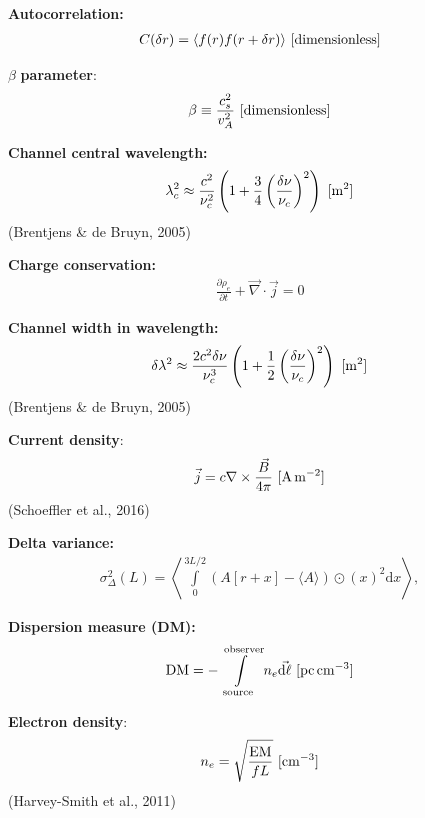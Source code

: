 \documentclass[a4paper,10pt]{article}
\begin{document}
{\noindent}\textbf{Autocorrelation:}
\begin{align*}
    C(\delta r) = \langle f(r)f(r+\delta r)\rangle ~ [{\rm dimensionless}]
\end{align*}

{\noindent}$\beta$ \textbf{parameter}: 
\begin{align*}
    \beta \equiv \frac{c_s^2}{v_A^2} ~ [{\rm dimensionless}]
\end{align*}

{\noindent}\textbf{Channel central wavelength:} 
\begin{align*}
\lambda_c^2 \approx \dfrac{c^2}{\nu_c^2} \left(1+\dfrac{3}{4}\left(\dfrac{\delta\nu}{\nu_c}\right)^2\right) ~ [{\rm m^2}]
\end{align*}
(Brentjens \& de Bruyn, 2005)

{\noindent}\textbf{Charge conservation:} 
\begin{align*}
    \frac{\partial\rho_e}{\partial t} + \vec\nabla\cdot\vec{j} = 0
\end{align*}

{\noindent}\textbf{Channel width in wavelength:} 
\begin{align*}
\delta\lambda^2 \approx \dfrac{2c^2\delta\nu}{\nu_c^3} \left(1+\dfrac{1}{2}\left(\dfrac{\delta\nu}{\nu_c}\right)^2\right) ~ [{\rm m^2}]
\end{align*}
(Brentjens \& de Bruyn, 2005)

{\noindent}\textbf{Current density}:
\begin{align*}
    \vec{j} = c\nabla\times\frac{\vec{B}}{4\pi} ~ [{\rm A\,m^{-2}}]
\end{align*}
(Schoeffler et al., 2016)

{\noindent}\textbf{Delta variance:}
\begin{align*}
    \sigma_\Delta^2(L) = \left\langle \int\limits_0^{3L/2} {(A[r+x]-\langle A\rangle)\odot(x)}^2\mathrm{d}x \right\rangle,
\end{align*}

{\noindent}\textbf{Dispersion measure (DM):}
\begin{align*}
    {\rm DM} = -\int\limits_\mathrm{source}^\mathrm{observer} n_e\vec{{\rm d}\ell} ~ [{\rm pc\,cm^{-3}}]
\end{align*}

{\noindent}\textbf{Electron density}:
\begin{align*}
    n_e = \sqrt{\frac{{\rm EM}}{fL}} ~ [{\rm cm^{-3}}]
\end{align*}
(Harvey-Smith et al., 2011)
\end{document}
